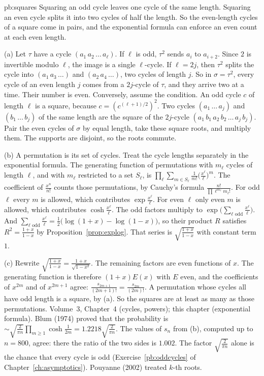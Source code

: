 \begin{solution}{pb:squares}
\idea Squaring an odd cycle leaves one cycle of the same length. Squaring an even cycle splits it into two cycles of half the length. So the even-length cycles of a square come in pairs, and the exponential formula can enforce an even count at each even length.

\writeup (a) Let $\tau$ have a cycle $(a_1\,a_2\,\dots\,a_\ell)$. If $\ell$ is odd, $\tau^2$ sends $a_i$ to $a_{i+2}$. Since $2$ is
invertible modulo $\ell$, the image is a single $\ell$-cycle. If $\ell=2j$, then $\tau^2$ splits the cycle into $(a_1\,a_3\,\dots)$ and
$(a_2\,a_4\,\dots)$, two cycles of length $j$. So in $\sigma=\tau^2$, every cycle of an even length $j$ comes from a $2j$-cycle of $\tau$,
and they arrive two at a time. Their number is even. Conversely, assume the condition. An odd cycle $c$ of length $\ell$ is a square, because
$c=(c^{(\ell+1)/2})^2$. Two cycles $(a_1\,\dots\,a_j)$ and $(b_1\,\dots\,b_j)$ of the same length are the square of the
$2j$-cycle $(a_1\,b_1\,a_2\,b_2\,\dots\,a_j\,b_j)$. Pair the even cycles of $\sigma$ by equal length, take these square roots,
and multiply them. The supports are disjoint, so the roots commute.

(b) A permutation is its set of cycles. Treat the cycle lengths separately in the exponential formula. The
generating function of permutations with $m_\ell$ cycles of length $\ell$, and with $m_\ell$ restricted to a set $S_\ell$, is
$\prod_\ell\sum_{m\in S_\ell}\frac1{m!}\bigl(\frac{x^\ell}\ell\bigr)^m$. The coefficient of $\frac{x^n}{n!}$ counts those permutations,
by Cauchy's formula $\frac{n!}{\prod\ell^{m_\ell}m_\ell!}$. For odd $\ell$ every $m$ is allowed, which contributes
$\exp\frac{x^\ell}\ell$. For even $\ell$ only even $m$ is allowed, which contributes $\cosh\frac{x^\ell}\ell$. The odd factors multiply to
$\exp\bigl(\sum_{\ell\text{ odd}}\frac{x^\ell}\ell\bigr)$. And $\sum_{\ell\text{ odd}}\frac{x^\ell}\ell=\frac12\bigl(\log(1+x)-\log(1-x)\bigr)$, so their product $R$
satisfies $R^2=\frac{1+x}{1-x}$ by Proposition~\ref{prop:explog}. That series is $\sqrt{\frac{1+x}{1-x}}$ with constant term $1$.

(c) Rewrite $\sqrt{\frac{1+x}{1-x}}=\frac{1+x}{\sqrt{1-x^2}}$. The remaining factors are even functions of $x$. The generating
function is therefore $(1+x)E(x)$ with $E$ even, and the coefficients of $x^{2m}$ and of $x^{2m+1}$ agree: $\frac{s_{2m+1}}{(2m+1)!}=\frac{s_{2m}}{(2m)!}$.
A permutation whose cycles all have odd length is a square, by (a). So the squares are at least as many as those permutations.
\tools Volume~3, Chapter~4 (cycles, powers); this chapter (exponential formula).
\leads Blum (1974) proved that the probability is $\sim\sqrt{\frac2{\pi n}}\prod_{m\ge1}\cosh\frac1{2m}=1.2218\sqrt{\frac2{\pi n}}$. The values of
$s_n$ from (b), computed up to $n=800$, agree: there the ratio of the two sides is $1.002$. The factor $\sqrt{\frac2{\pi n}}$ alone is the chance that every cycle is odd
(Exercise~\ref{pb:oddcycles} of Chapter~\ref{ch:asymptotics}). Pouyanne (2002) treated $k$-th roots.
\end{solution}

